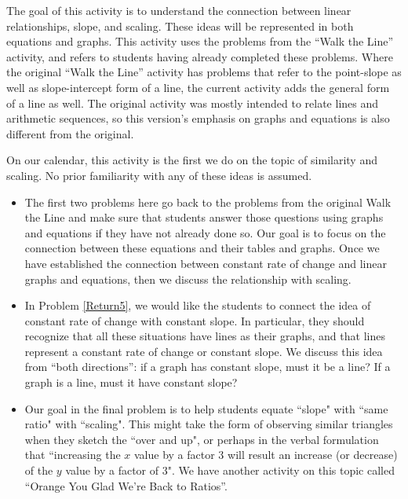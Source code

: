 \documentclass{ximera}
\begin{document}
\newpage
\begin{instructorNotes}
The goal of this activity is to understand the connection between linear relationships, slope, and scaling.  These ideas will be represented in both equations and graphs.  This activity uses the problems from the ``Walk the Line'' activity, and refers to students having already completed these problems.  Where the original ``Walk the Line'' activity has problems that refer to the point-slope as well as slope-intercept form of a line, the current activity adds the general form of a line as well.  The original activity was mostly intended to relate lines and arithmetic sequences, so this version's emphasis on graphs and equations is also different from the original.

On our calendar, this activity is the first we do on the topic of similarity and scaling.  No prior familiarity with any of these ideas is assumed. 




 \begin{itemize}
    \item The first two problems here go back to the problems from the original Walk the Line and make sure that students answer those questions using graphs and equations if they have not already done so.  Our goal is to focus on the connection between these equations and their tables and graphs. Once we have established the connection between constant rate of change and linear graphs and equations, then we discuss the relationship with scaling.
    \item In Problem \ref{Return5}, we would like the students to connect the idea of constant rate of change with constant slope.  In particular, they should recognize that all these situations have lines as their graphs, and that lines represent a constant rate of change or constant slope. We discuss this idea from ``both directions'': if a graph has constant slope, must it be a line?  If a graph is a line, must it have constant slope?
    \item Our goal in the final problem is to help students equate ``slope" with ``same ratio" with ``scaling".  This might take the form of observing similar triangles when they sketch the ``over and up", or perhaps in the verbal formulation that ``increasing the $x$ value by a factor 3 will result an increase (or decrease) of the $y$ value by a factor of 3".  We have another activity on this topic called ``Orange You Glad We're Back to Ratios''.
\end{itemize}



\end{instructorNotes}
\end{document}
